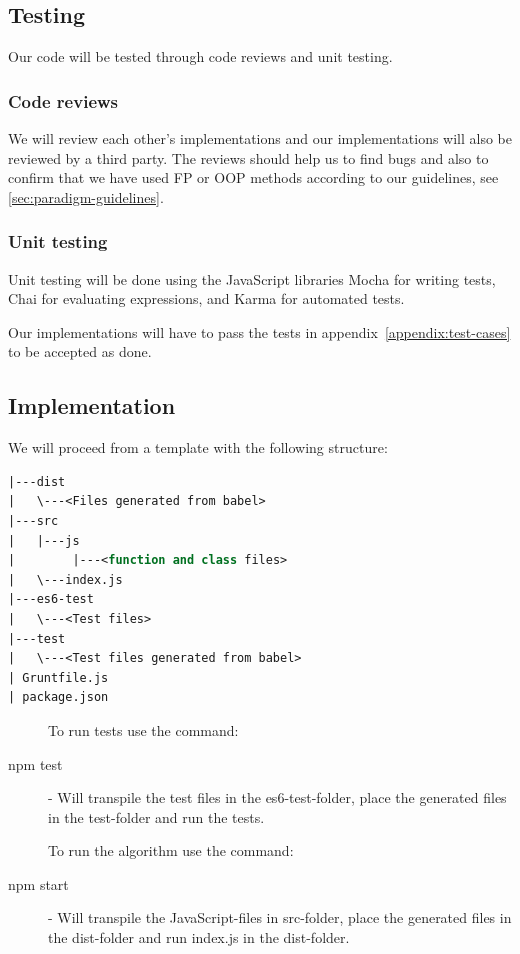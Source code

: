 \documentclass {article}
\begin{document}
\subsection{Testing}
Our code will be tested through code reviews and unit testing.
\subsubsection{Code reviews}
We will review each other's implementations and our implementations will also be reviewed by a third party. The reviews should help us to find bugs and also to confirm that we have used FP or OOP methods according to our guidelines, see \ref{sec:paradigm-guidelines}.
\subsubsection{Unit testing}
Unit testing will be done using the JavaScript libraries Mocha \cite{mocha} for writing tests, Chai \cite{chai} for evaluating expressions, and Karma \cite{karma} for automated tests.

Our implementations will have to pass the tests in appendix~\ref{appendix:test-cases} to be accepted as done.
\subsection{Implementation}
We will proceed from a template with the following structure:

\begin{lstlisting}[language=Pascal, deletekeywords={function, and}, numbers=none]
|---dist
|   \---<Files generated from babel>
|---src
|   |---js
|        |---<function and class files>
|   \---index.js
|---es6-test
|   \---<Test files>
|---test
|   \---<Test files generated from babel>
| Gruntfile.js
| package.json
\end{lstlisting}

\begin{description}
\item[] To run tests use the command:
\item[npm test] - Will transpile the test files in the es6-test-folder, place the generated files in the test-folder and run the tests.
\item[] To run the algorithm use the command:
\item[npm start] - Will transpile the JavaScript-files in src-folder, place the generated files in the dist-folder and run index.js in the dist-folder.
\end{description}
\end{document}
